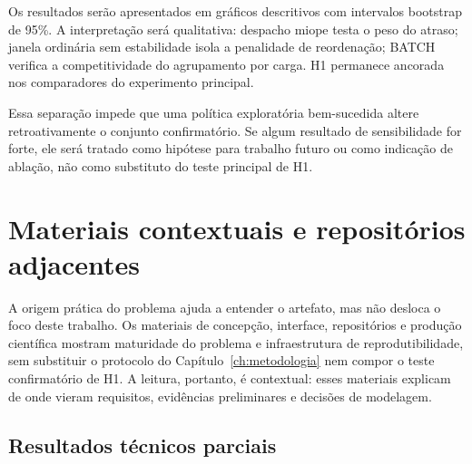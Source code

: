 \documentclass[
  12pt,
  oneside,
  a4paper,
  sumario=tradicional,
  brazil
]{abntex2}
\begin{document}
\begin{apendicesenv}
Os resultados ser\~ao apresentados em gr\'aficos descritivos com intervalos bootstrap de 95\%. A interpreta\c{c}\~ao ser\'a qualitativa: despacho miope testa o peso do atraso; janela ordin\'aria sem estabilidade isola a penalidade de reordena\c{c}\~ao; BATCH verifica a competitividade do agrupamento por carga. H1 permanece ancorada nos comparadores do experimento principal.

Essa separa\c{c}\~ao impede que uma pol\'itica explorat\'oria bem-sucedida altere retroativamente o conjunto confirmat\'orio. Se algum resultado de sensibilidade for forte, ele ser\'a tratado como hip\'otese para trabalho futuro ou como indica\c{c}\~ao de abla\c{c}\~ao, n\~ao como substituto do teste principal de H1.

\chapter{Materiais contextuais e reposit\'orios adjacentes}\label{apx:materiais-contextuais}

A origem pr\'atica do problema ajuda a entender o artefato, mas n\~ao desloca o foco deste trabalho. Os materiais de concep\c{c}\~ao, interface, reposit\'orios e produ\c{c}\~ao cient\'ifica mostram maturidade do problema e infraestrutura de reprodutibilidade, sem substituir o protocolo do Cap\'itulo~\ref{ch:metodologia} nem compor o teste confirmat\'orio de H1. A leitura, portanto, \'e contextual: esses materiais explicam de onde vieram requisitos, evid\^encias preliminares e decis\~oes de modelagem.

\section{Resultados t\'ecnicos parciais}


\end{apendicesenv}
\end{document}
